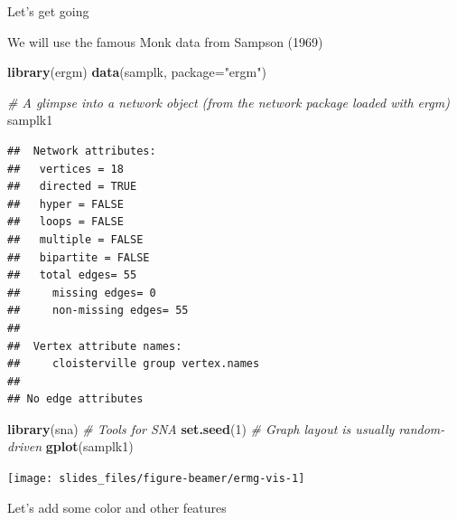 \documentclass[10pt,ignorenonframetext,handout,aspectratio=169,]{beamer}
\newenvironment{Shaded}{\begin{snugshade}}{\end{snugshade}}
\newcommand{\CommentTok}[1]{\textcolor[rgb]{0.56,0.35,0.01}{\textit{#1}}}
\newcommand{\DataTypeTok}[1]{\textcolor[rgb]{0.13,0.29,0.53}{#1}}
\newcommand{\DecValTok}[1]{\textcolor[rgb]{0.00,0.00,0.81}{#1}}
\newcommand{\KeywordTok}[1]{\textcolor[rgb]{0.13,0.29,0.53}{\textbf{#1}}}
\newcommand{\NormalTok}[1]{#1}
\newcommand{\StringTok}[1]{\textcolor[rgb]{0.31,0.60,0.02}{#1}}
\begin{document}
\begin{frame}[fragile]{Let's get going}
\protect\hypertarget{lets-get-going}{}

We will use the famous Monk data from Sampson (1969)

\footnotesize

\begin{Shaded}
\begin{Highlighting}[]
\KeywordTok{library}\NormalTok{(ergm)}
\KeywordTok{data}\NormalTok{(samplk, }\DataTypeTok{package=}\StringTok{"ergm"}\NormalTok{)}

\CommentTok{# A glimpse into a network object (from the network package loaded with ergm)}
\NormalTok{samplk1}
\end{Highlighting}
\end{Shaded}

\begin{verbatim}
##  Network attributes:
##   vertices = 18 
##   directed = TRUE 
##   hyper = FALSE 
##   loops = FALSE 
##   multiple = FALSE 
##   bipartite = FALSE 
##   total edges= 55 
##     missing edges= 0 
##     non-missing edges= 55 
## 
##  Vertex attribute names: 
##     cloisterville group vertex.names 
## 
## No edge attributes
\end{verbatim}

\normalsize

\end{frame}

\begin{frame}[fragile]

\footnotesize

\begin{Shaded}
\begin{Highlighting}[]
\KeywordTok{library}\NormalTok{(sna) }\CommentTok{# Tools for SNA}
\KeywordTok{set.seed}\NormalTok{(}\DecValTok{1}\NormalTok{)  }\CommentTok{# Graph layout is usually random-driven}
\KeywordTok{gplot}\NormalTok{(samplk1)}
\end{Highlighting}
\end{Shaded}

\begin{center}\texttt{[image: slides\_files/figure-beamer/ermg-vis-1]} \end{center}

\normalsize

\pause Let's add some color and other features

\end{frame}
\end{document}
